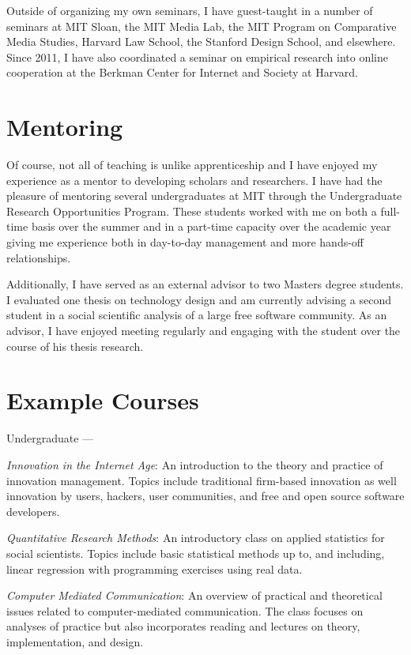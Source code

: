 \documentclass[10pt]{memoir}
\newenvironment{enumerate*}%
  {\begin{enumerate}%
    \setlength{\itemsep}{0pt}%
    \setlength{\parskip}{0pt}}%
  {\end{enumerate}}
\begin{document}
Outside of organizing my own seminars, I have guest-taught in a number
of seminars at MIT Sloan, the MIT Media Lab, the MIT Program on
Comparative Media Studies, Harvard Law School, the Stanford Design
School, and elsewhere. Since 2011, I have also coordinated a seminar
on empirical research into online cooperation at the Berkman Center
for Internet and Society at Harvard.

\section{Mentoring}

Of course, not all of teaching is unlike apprenticeship and I have
enjoyed my experience as a mentor to developing scholars and
researchers. I have had the pleasure of mentoring several
undergraduates at MIT through the Undergraduate Research Opportunities
Program. These students worked with me on both a full-time basis over
the summer and in a part-time capacity over the academic year giving
me experience both in day-to-day management and more hands-off
relationships.

Additionally, I have served as an external advisor to two Masters
degree students. I evaluated one thesis on technology design and am
currently advising a second student in a social scientific analysis of
a large free software community. As an advisor, I have enjoyed meeting
regularly and engaging with the student over the course of his thesis
research.

\section{Example Courses}

Undergraduate ---

\begin{enumerate*}
\item \emph{Innovation in the Internet Age}: An introduction to the
  theory and practice of innovation management. Topics include
  traditional firm-based innovation as well innovation by users,
  hackers, user communities, and free and open source software
  developers.
\item \emph{Quantitative Research Methods}: An introductory class on
  applied statistics for social scientists. Topics include basic
  statistical methods up to, and including, linear regression with
  programming exercises using real data.
\item \emph{Computer Mediated Communication}: An overview of practical
  and theoretical issues related to computer-mediated
  communication. The class focuses on analyses of practice but also
  incorporates reading and lectures on theory, implementation, and
  design.
\end{enumerate*}
\end{document}
